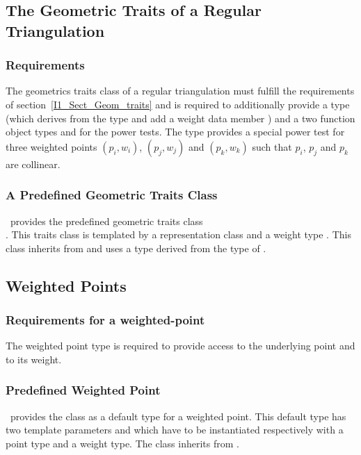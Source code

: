 \subsection{The Geometric Traits of a Regular Triangulation}

\subsubsection{Requirements}

The geometrics traits class of a regular triangulation
must fulfill the requirements of section~\ref{I1_Sect_Geom_traits}
and is required to additionally provide  
a  type (which derives from the type  
and add a weight data member )
and a two function object types  and 
for the power tests. The type 
provides a special power test for three weighted points
 $(p_i, w_i)$, $(p_j, w_j)$ and $(p_k, w_k)$ such that
$p_i$, $p_j$ and $p_k$ are collinear.



\subsubsection{A Predefined Geometric Traits Class}
\cgal\ provides the predefined geometric traits class \\
.
This traits class is templated by a representation class 
and a weight type .
This class inherits from
and uses a  type
derived from the type  of
.



\subsection{Weighted Points}

\subsubsection{Requirements for a weighted-point}
The weighted point type  
is required to provide access to the underlying  point and to its weight.


\subsubsection{Predefined Weighted Point}
\cgal\ provides the class 
as a default type for a  weighted point.
This default type has two template parameters 
and   which have to be instantiated respectively 
with a point type and a weight type.
The class 
 inherits from .




